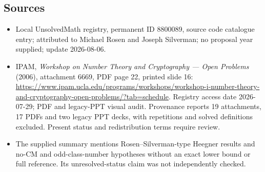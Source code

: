 \documentclass[11pt]{article}
\begin{document}
\subsection{Sources}
\begin{itemize}
\item Local UnsolvedMath registry, permanent ID 8800089, source code catalogue entry; attributed to Michael Rosen and Joseph Silverman; no proposal year supplied; update 2026-08-06.
\item IPAM, \emph{Workshop on Number Theory and Cryptography --- Open Problems} (2006), attachment 6669, PDF page 22, printed slide 16: \url{https://www.ipam.ucla.edu/programs/workshops/workshop-i-number-theory-and-cryptography-open-problems/?tab=schedule}. Registry access date 2026-07-29; PDF and legacy-PPT visual audit. Provenance reports 19 attachments, 17 PDFs and two legacy PPT decks, with repetitions and solved definitions excluded. Present status and redistribution terms require review.
\item The supplied summary mentions Rosen--Silverman-type Heegner results and no-CM and odd-class-number hypotheses without an exact lower bound or full reference. Its unresolved-status claim was not independently checked.
\end{itemize}
\end{document}
